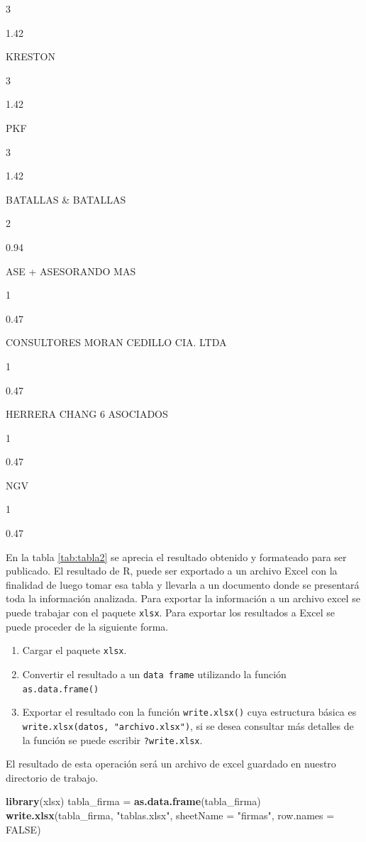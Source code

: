 \documentclass[]{book}
\newenvironment{Shaded}{\begin{snugshade}}{\end{snugshade}}
\newcommand{\KeywordTok}[1]{\textcolor[rgb]{0.13,0.29,0.53}{\textbf{#1}}}
\newcommand{\DataTypeTok}[1]{\textcolor[rgb]{0.13,0.29,0.53}{#1}}
\newcommand{\StringTok}[1]{\textcolor[rgb]{0.31,0.60,0.02}{#1}}
\newcommand{\OtherTok}[1]{\textcolor[rgb]{0.56,0.35,0.01}{#1}}
\newcommand{\NormalTok}[1]{#1}
\providecommand{\tightlist}{%
  \setlength{\itemsep}{0pt}\setlength{\parskip}{0pt}}
\begin{document}
3

1.42

KRESTON

3

1.42

PKF

3

1.42

BATALLAS \& BATALLAS

2

0.94

ASE + ASESORANDO MAS

1

0.47

CONSULTORES MORAN CEDILLO CIA. LTDA

1

0.47

HERRERA CHANG 6 ASOCIADOS

1

0.47

NGV

1

0.47

En la tabla \ref{tab:tabla2} se aprecia el resultado obtenido y
formateado para ser publicado. El resultado de R, puede ser exportado a
un archivo Excel con la finalidad de luego tomar esa tabla y llevarla a
un documento donde se presentará toda la información analizada. Para
exportar la información a un archivo excel se puede trabajar con el
paquete \texttt{xlsx}. Para exportar los resultados a Excel se puede
proceder de la siguiente forma.

\begin{enumerate}
\def\labelenumi{\arabic{enumi}.}
\tightlist
\item
  Cargar el paquete \texttt{xlsx}.
\item
  Convertir el resultado a un \texttt{data\ frame} utilizando la función
  \texttt{as.data.frame()}
\item
  Exportar el resultado con la función \texttt{write.xlsx()} cuya
  estructura básica es \texttt{write.xlsx(datos,\ "archivo.xlsx")}, si
  se desea consultar más detalles de la función se puede escribir
  \texttt{?write.xlsx}.
\end{enumerate}

El resultado de esta operación será un archivo de excel guardado en
nuestro directorio de trabajo.

\begin{Shaded}
\begin{Highlighting}[]
\KeywordTok{library}\NormalTok{(xlsx)}
\NormalTok{tabla_firma =}\StringTok{ }\KeywordTok{as.data.frame}\NormalTok{(tabla_firma)}
\KeywordTok{write.xlsx}\NormalTok{(tabla_firma, }\StringTok{"tablas.xlsx"}\NormalTok{, }\DataTypeTok{sheetName =} \StringTok{"firmas"}\NormalTok{, }\DataTypeTok{row.names =} \OtherTok{FALSE}\NormalTok{)}
\end{Highlighting}
\end{Shaded}
\end{document}
